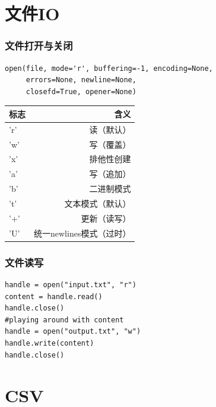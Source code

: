 \documentclass{beamer}
\begin{document}
\section{文件IO} %
\label{sec:文件IO}
\begin{frame}[t,fragile]
  \frametitle{文件打开与关闭}
\begin{verbatim}
open(file, mode='r', buffering=-1, encoding=None, 
     errors=None, newline=None, 
     closefd=True, opener=None)	
\end{verbatim}

\begin{table}
	\begin{tabular}
		{lr}
		\hline
		标志 & 含义\\
		\hline
		'r' 	& 读（默认）\\
		'w' 	& 写（覆盖）\\
		'x' 	& 排他性创建\\
		'a' 	& 写（追加）\\
		'b' 	& 二进制模式\\
		't' 	& 文本模式（默认）\\
		'+' 	& 更新（读写）\\
		'U' 	& 统一newlines模式（过时）\\
		\hline
	\end{tabular}
\end{table}
\end{frame}
\begin{frame}[t,fragile]
  \frametitle{文件读写}
	\begin{verbatim}
handle = open("input.txt", "r")
content = handle.read()
handle.close()
#playing around with content
handle = open("output.txt", "w")
handle.write(content)
handle.close()

\end{verbatim}
	
\end{frame}
\section{CSV}
\end{document}
